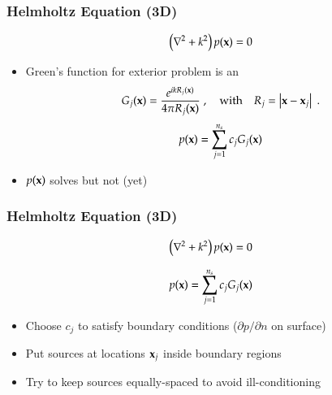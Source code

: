 \begin{frame}
  \frametitle{Helmholtz Equation (3D)\\
    }
  \begin{tcolorbox}
    \begin{equation*}
      \left( \nabla^2 + k^2 \right) p(\mathbf{x}) = 0 
    \end{equation*}
  \end{tcolorbox}
  \begin{itemize}
  \item Green's function for exterior problem is an 
    \begin{equation*}
      G_j(\mathbf{x}) = \frac{e^{i k R_j(\mathbf{x})}}{4 \pi R_j(\mathbf{x})} \; ,
      \quad\mbox{with}\quad  
      R_j = \left| \mathbf{x}-\mathbf{x}_j \right| \; .
    \end{equation*}
    \begin{equation*}
      p(\mathbf{x}) = \sum_{j=1}^{n_s} c_j G_j(\mathbf{x}) 
    \end{equation*}
  \item $p(\mathbf{x})$ solves  but not (yet) 
  \end{itemize}
\end{frame}


\begin{frame}
  \frametitle{Helmholtz Equation (3D)\\
    }
  \begin{tcolorbox}
    \begin{equation*}
      \left( \nabla^2 + k^2 \right) p(\mathbf{x}) = 0 
    \end{equation*}
  \end{tcolorbox}
    \begin{equation*}
      p(\mathbf{x}) = \sum_{j=1}^{n_s} c_j G_j(\mathbf{x}) 
    \end{equation*}
  \begin{itemize}
  \item Choose $c_j$ to satisfy boundary conditions ($\partial p/\partial n$ on surface)
  \item Put sources at locations $\mathbf{x}_j$ inside boundary regions
  \item Try to keep sources equally-spaced to avoid ill-conditioning
  \end{itemize}
\end{frame}

